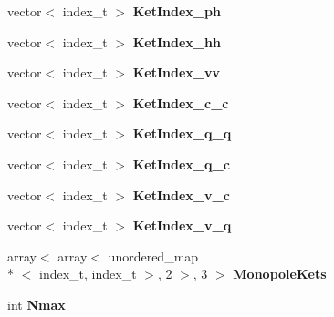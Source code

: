 \begin{DoxyCompactItemize}
\item 
\hypertarget{classModelSpace_ac9e07e40e307b3c0a2d9c2cb20089aa2}{vector$<$ index\-\_\-t $>$ {\bfseries Ket\-Index\-\_\-ph}}\label{classModelSpace_ac9e07e40e307b3c0a2d9c2cb20089aa2}

\item 
\hypertarget{classModelSpace_a1794fcc318be8b851c6b52f31a048175}{vector$<$ index\-\_\-t $>$ {\bfseries Ket\-Index\-\_\-hh}}\label{classModelSpace_a1794fcc318be8b851c6b52f31a048175}

\item 
\hypertarget{classModelSpace_a523804668cdb8578187ebb585b81a8ba}{vector$<$ index\-\_\-t $>$ {\bfseries Ket\-Index\-\_\-vv}}\label{classModelSpace_a523804668cdb8578187ebb585b81a8ba}

\item 
\hypertarget{classModelSpace_abfdb79c5ad52d4a0fcf3df7f7469d61d}{vector$<$ index\-\_\-t $>$ {\bfseries Ket\-Index\-\_\-c\-\_\-c}}\label{classModelSpace_abfdb79c5ad52d4a0fcf3df7f7469d61d}

\item 
\hypertarget{classModelSpace_a08e73f22ccbf73916a425a650d7dac3a}{vector$<$ index\-\_\-t $>$ {\bfseries Ket\-Index\-\_\-q\-\_\-q}}\label{classModelSpace_a08e73f22ccbf73916a425a650d7dac3a}

\item 
\hypertarget{classModelSpace_acfd6788f3fe214fac6da220caaffcacf}{vector$<$ index\-\_\-t $>$ {\bfseries Ket\-Index\-\_\-q\-\_\-c}}\label{classModelSpace_acfd6788f3fe214fac6da220caaffcacf}

\item 
\hypertarget{classModelSpace_a08e4e9f6582fdde17d321d7acbeeddaa}{vector$<$ index\-\_\-t $>$ {\bfseries Ket\-Index\-\_\-v\-\_\-c}}\label{classModelSpace_a08e4e9f6582fdde17d321d7acbeeddaa}

\item 
\hypertarget{classModelSpace_a398c8659d936c48098af92767da10a29}{vector$<$ index\-\_\-t $>$ {\bfseries Ket\-Index\-\_\-v\-\_\-q}}\label{classModelSpace_a398c8659d936c48098af92767da10a29}

\item 
\hypertarget{classModelSpace_a98149a6987fff9c2ed9898f38d017cae}{array$<$ array$<$ unordered\-\_\-map\\*
$<$ index\-\_\-t, index\-\_\-t $>$, 2 $>$, 3 $>$ {\bfseries Monopole\-Kets}}\label{classModelSpace_a98149a6987fff9c2ed9898f38d017cae}

\item 
\hypertarget{classModelSpace_aa049d819d4d18cfb466777581cc349d2}{int {\bfseries Nmax}}\label{classModelSpace_aa049d819d4d18cfb466777581cc349d2}


\end{DoxyCompactItemize}
